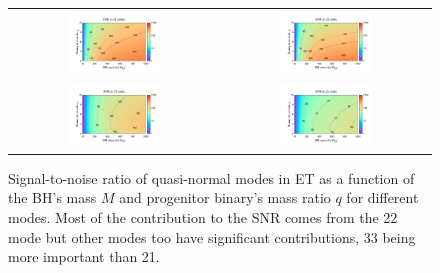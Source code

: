 \begin{figure}
\centering
\begin{tabular}{|c|c|}
\hline
\includegraphics[width=0.45\textwidth]{./Sec_ET_ScienceCase/ET-SNR-all.pdf}  &
\includegraphics[width=0.45\textwidth]{./Sec_ET_ScienceCase/ET-SNR-22.pdf} \\
\includegraphics[width=0.45\textwidth]{./Sec_ET_ScienceCase/ET-SNR-33.pdf} &
\includegraphics[width=0.45\textwidth]{./Sec_ET_ScienceCase/ET-SNR-21.pdf} \\
\hline
\end{tabular}
\caption{Signal-to-noise ratio of quasi-normal modes in ET as a 
function of the BH's mass $M$ and progenitor binary's 
mass ratio $q$ for different modes. Most of the contribution to the 
SNR comes from the 22 mode but other modes too have significant 
contributions, 33 being more important than 21.} 
\label{fig:snr}
\end{figure}

